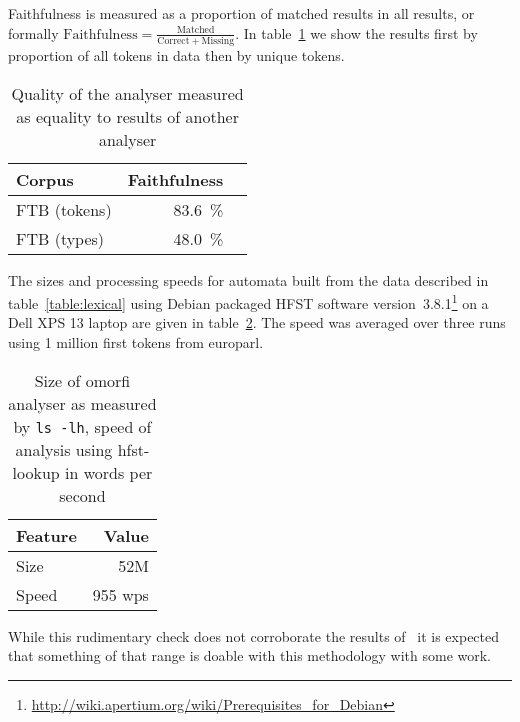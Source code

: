 \documentclass[a4paper,12pt]{article}
\begin{document}
Faithfulness is measured as a proportion of matched results in all results, or
formally $\mathrm{Faithfulness} = \frac{\mathrm{Matched}}{\mathrm{Correct} +
\mathrm{Missing}}$. In table~\ref{table:quality} we show the results first
by proportion of all tokens in data then by unique tokens.

\begin{table}
    \begin{scriptsize}
    \centering
    \begin{tabular}{|l|r|r|}
        \hline
        \bf Corpus & \bf Faithfulness \\
        \hline
        FTB (tokens) & 83.6~\% \\
        FTB (types)  & 48.0~\% \\
        \hline
    \end{tabular}
    \caption{Quality of the analyser measured as equality to results of
        another analyser \label{table:quality}}
  \end{scriptsize}
\end{table}

The sizes and processing speeds for automata built from the data described in
table~\ref{table:lexical} using Debian packaged HFST software
version~3.8.1\footnote{\url{http://wiki.apertium.org/wiki/Prerequisites_for_Debian}}
on a Dell XPS 13 laptop are given in table~\ref{table:size-speed}. The speed
was averaged over three runs using 1 million first tokens from europarl.

\begin{table}
    \begin{scriptsize}
        \centering
        \begin{tabular}{|l|r|}
            \hline
            \bf Feature & \bf Value \\
            \hline
            Size & 52M \\
            Speed & 955 wps\\
        \end{tabular}
        \caption{Size of omorfi analyser as measured by \texttt{ls -lh}, speed
        of analysis using hfst-lookup in words per second \label{table:size-speed}}
    \end{scriptsize}
\end{table}

While this rudimentary check does not corroborate the results
of~\citet{silfverberg2009hfst} it is expected that something of that range is
doable with this methodology with some work.
\end{document}
